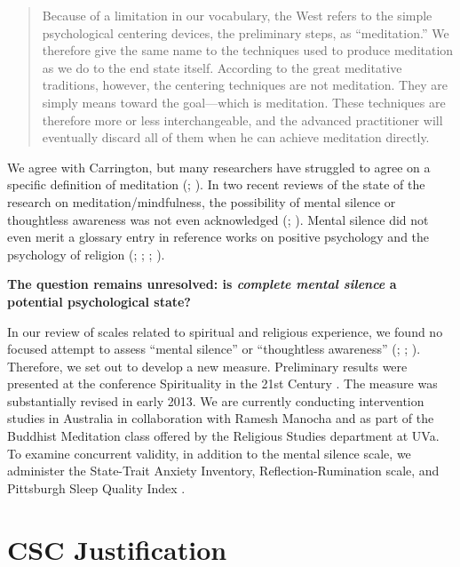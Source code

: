 \documentclass[12pt]{article}
\begin{document}
\begin{quotation}
\noindent Because of a limitation in our vocabulary, the West refers to the simple
psychological centering devices, the preliminary steps, as ``meditation.''
We therefore give the same name to the techniques used to produce
meditation as we do to the end state itself. According to the great
meditative traditions, however, the centering techniques are not
meditation. They are simply means toward the goal---which is meditation.
These techniques are therefore more or less interchangeable, and the
advanced practitioner will eventually discard all of them when he can
achieve meditation directly. \cite[pp.~8--9]{carrington1977}
\end{quotation}

We agree with Carrington, but many
researchers have struggled to agree on a specific
definition of meditation (;
).
In two recent reviews of the state of the research on meditation/mindfulness,
the possibility of mental silence or thoughtless awareness was not
even acknowledged (; ).
Mental silence did not even merit a glossary entry in reference works on
positive psychology and the psychology of religion
(; ;
; ).

\textbf{The question remains unresolved: is \emph{complete mental silence} a
potential psychological state?}

In our review of scales related to spiritual and religious experience,
we found no focused attempt to assess
``mental silence'' or ``thoughtless awareness'' (;
; ).
Therefore, we set out to develop a new measure.
Preliminary results were presented at the conference Spirituality in the
21st Century \cite{pritikin2013}. %
The measure was substantially revised in early 2013.
We are currently conducting intervention studies in Australia in
collaboration with Ramesh Manocha and as part of the Buddhist
Meditation class offered by the Religious Studies department at UVa.
To examine concurrent validity, in addition to the mental silence scale,
we administer the State-Trait Anxiety
Inventory, Reflection-Rumination scale, and Pittsburgh Sleep Quality
Index \cite{buysse1989,spielberger1983,trapnell1999}.

\section{CSC Justification}
\end{document}
